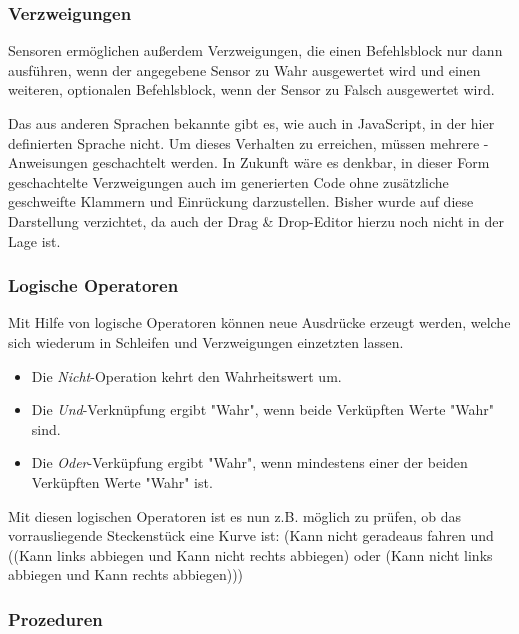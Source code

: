 \subsubsection{Verzweigungen}
\label{sec:implementation:program:elements:if-else}

Sensoren ermöglichen außerdem Verzweigungen, die einen Befehlsblock nur dann ausführen, wenn der angegebene Sensor zu Wahr ausgewertet wird und einen weiteren, optionalen Befehlsblock, wenn der Sensor zu Falsch ausgewertet wird.

Das aus anderen Sprachen bekannte  gibt es, wie auch in JavaScript, in der hier definierten Sprache nicht. Um dieses Verhalten zu erreichen, müssen mehrere -Anweisungen geschachtelt werden. In Zukunft wäre es denkbar, in dieser Form geschachtelte Verzweigungen auch im generierten Code ohne zusätzliche geschweifte Klammern und Einrückung darzustellen. Bisher wurde auf diese Darstellung verzichtet, da auch der Drag \& Drop-Editor hierzu noch nicht in der Lage ist.

\subsubsection{Logische Operatoren}
\label{sec:implementation:program:elements:op}

Mit Hilfe von logische Operatoren können neue Ausdrücke erzeugt werden, welche sich wiederum in Schleifen und Verzweigungen einzetzten lassen.

\begin{itemize}[noitemsep]
  \item Die \emph{Nicht}-Operation kehrt den Wahrheitswert um.
  \item Die \emph{Und}-Verknüpfung ergibt "Wahr", wenn beide Verküpften Werte "Wahr" sind.
  \item Die \emph{Oder}-Verküpfung ergibt "Wahr", wenn mindestens einer der beiden Verküpften Werte "Wahr" ist.
\end{itemize}

Mit diesen logischen Operatoren ist es nun z.B. möglich zu prüfen, ob das vorrausliegende Steckenstück eine Kurve ist: (Kann nicht geradeaus fahren und ((Kann links abbiegen und Kann nicht rechts abbiegen) oder (Kann nicht links abbiegen und Kann rechts abbiegen)))

\subsubsection{Prozeduren}
\label{sec:implementation:program:elements:proc}

